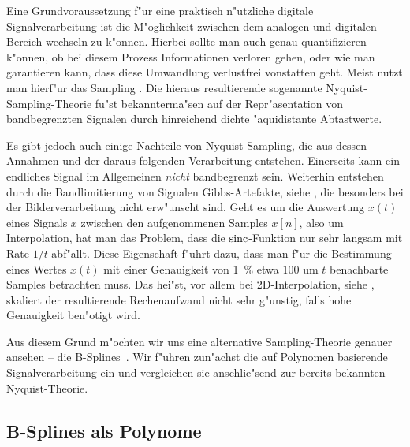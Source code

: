 %
Eine Grundvoraussetzung f"ur eine praktisch n"utzliche digitale Signalverarbeitung ist die M"oglichkeit zwischen dem analogen und digitalen Bereich wechseln zu k"onnen. 
Hierbei sollte man auch genau quantifizieren k"onnen, ob bei diesem Prozess Informationen verloren gehen, oder wie man garantieren kann, dass diese Umwandlung verlustfrei vonstatten geht. 
Meist nutzt man hierf"ur das Sampling . 
Die hieraus resultierende sogenannte Nyquist-Sampling-Theorie fu"st bekannterma"sen auf der Repr"asentation von bandbegrenzten Signalen durch hinreichend dichte "aquidistante Abtastwerte.

Es gibt jedoch auch einige Nachteile von Nyquist-Sampling, die aus dessen Annahmen und der daraus folgenden Verarbeitung entstehen. 
Einerseits kann ein endliches Signal im Allgemeinen \emph{nicht} bandbegrenzt sein. 
Weiterhin entstehen durch die Bandlimitierung von Signalen Gibbs-Artefakte, siehe , die besonders bei der Bilderverarbeitung nicht erw"unscht sind. 
Geht es um die Auswertung $x(t)$ eines Signals $x$ zwischen den aufgenommenen Samples $x[n]$, also um Interpolation, hat man das Problem, dass die $\operatorname*{sinc}$-Funktion nur sehr langsam mit Rate $1/t$ abf"allt.
Diese Eigenschaft f"uhrt dazu, dass man f"ur die Bestimmung eines Wertes $x(t)$ mit einer Genauigkeit von \SI{1}{\percent} etwa $100$ um $t$ benachbarte Samples betrachten muss. 
Das hei"st, vor allem bei 2D-Interpolation, siehe , skaliert der resultierende Rechenaufwand nicht sehr g"unstig, falls hohe Genauigkeit ben"otigt wird.

Aus diesem Grund m"ochten wir uns eine alternative Sampling-Theorie genauer ansehen -- die B-Splines~\cite{unser1999splines_mag}. 
Wir f"uhren zun"achst die auf Polynomen basierende Signalverarbeitung ein und vergleichen sie anschlie"send zur bereits bekannten Nyquist-Theorie.

\subsection{B-Splines als Polynome}

